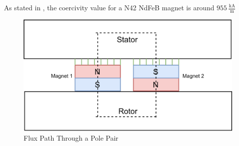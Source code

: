 \documentclass{article}
\begin{document}
As stated in \cite{e-magnetsuk}, the coercivity value for a N42 NdFeB magnet is around $955 \: \mathrm{\frac{kA}{m}}$



\begin{figure}[h!]
\centering
\includegraphics[scale=1.2]{Figures/FluxPath.png}
\caption{Flux Path Through a Pole Pair }
\label{fig:FluxPath}
\end{figure}
\end{document}
